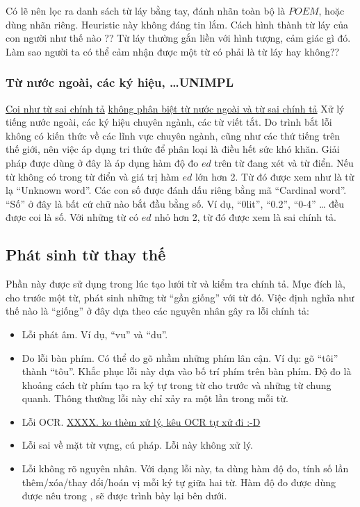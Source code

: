 \documentclass[a4paper,oneside]{book} %
\newcommand{\note}[1]{\underline{#1}}
\begin{document}
Có lẽ nên lọc ra danh sách từ láy bằng tay, đánh nhãn toàn bộ là
$POEM$, hoặc dùng nhãn riêng. Heuristic này không đáng tin lắm.
Cách hình thành từ láy của con người như thế nào ?? Từ láy thường gắn
liền với hình tượng, cảm giác gì đó. Làm sao người ta có thể cảm nhận
được một từ có phải là từ láy hay không??

\subsubsection{Từ nước ngoài, các ký hiệu, \ldots UNIMPL}

\note{Coi như từ sai chính tả}
\note{không phân biệt từ nước ngoài và từ sai chính tả}
Xử lý tiếng nước ngoài, các ký hiệu chuyên ngành, các từ viết tắt. Do
trình bắt lỗi không có kiến thức về các lĩnh vực chuyên 
ngành, cũng như các thứ tiếng trên thế giới, nên việc áp dụng tri thức
để phân loại là điều hết sức khó khăn. Giải pháp được dùng ở đây là áp
dụng hàm độ đo $ed$ trên từ đang xét và từ điển. Nếu từ không có trong
từ điển và giá trị hàm $ed$ lớn hơn 2. Từ đó được xem như là từ lạ
``Unknown word''. Các con số được đánh dấu riêng bằng mã ``Cardinal word''.
``Số'' ở đây là bất cứ chữ nào bắt đầu bằng số. Ví dụ, ``0lit'',
``0.2'', ``0-4'' \ldots{} đều được coi là số. Với những từ có $ed$ nhỏ
hơn 2, từ đó được xem là sai chính tả. 

\subsection{Phát sinh từ thay thế}

Phần này được sử dụng trong lúc tạo lưới từ và kiểm tra chính
tả. Mục đích là, cho trước một từ, phát sinh những từ ``gần giống''
với từ đó. Việc định nghĩa như thế nào là ``giống'' ở đây dựa theo các
nguyên nhân gây ra lỗi chính tả:
\begin{itemize}
\item Lỗi phát âm. Ví dụ, ``vu'' và ``du''. 
\item Do lỗi bàn phím. Có thể do gõ nhầm những phím lân cận. Ví dụ: gõ
  ``tôi'' thành ``tôu''. Khắc phục lỗi này dựa vào bố trí phím trên
  bàn phím. Độ đo là khoảng cách từ phím tạo ra ký tự trong từ cho
  trước và những từ chung quanh. Thông thường lỗi này chỉ xảy ra một
  lần trong mỗi từ.
\item Lỗi OCR. \note{XXXX. ko thèm xử lý, kêu OCR tự xử đi :-D}
\item Lỗi sai về mặt từ vựng, cú pháp. Lỗi này không xử lý.
\item Lỗi không rõ nguyên nhân. Với dạng lỗi này, ta dùng hàm độ đo,
  tính số lần thêm/xóa/thay đổi/hoán vị mỗi ký tự giữa hai từ. Hàm độ đo
  được dùng được nêu trong \cite{Oflazer}, sẽ được trình bày lại bên
  dưới.
\end{itemize}
\end{document}
